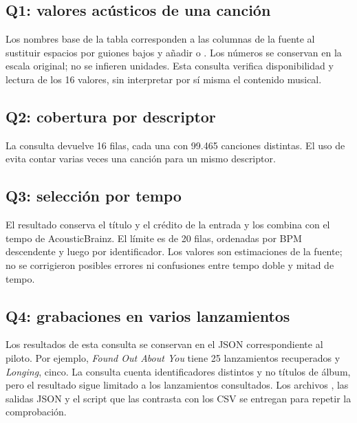 \documentclass[11pt,a4paper]{article}
\begin{document}
\subsection{Q1: valores acústicos de una canción}



Los nombres base de la tabla corresponden a las columnas de la fuente al sustituir espacios por guiones bajos y añadir  o . Los números se conservan en la escala original; no se infieren unidades. Esta consulta verifica disponibilidad y lectura de los 16 valores, sin interpretar por sí misma el contenido musical.

\newpage
\subsection{Q2: cobertura por descriptor}

La consulta devuelve 16 filas, cada una con 99.465 canciones distintas. El uso de  evita contar varias veces una canción para un mismo descriptor.

\subsection{Q3: selección por tempo}

El resultado conserva el título y el crédito de la entrada y los combina con el tempo de AcousticBrainz. El límite es de 20 filas, ordenadas por BPM descendente y luego por identificador. Los valores son estimaciones de la fuente; no se corrigieron posibles errores ni confusiones entre tempo doble y mitad de tempo.

\subsection{Q4: grabaciones en varios lanzamientos}

Los resultados de esta consulta se conservan en el JSON correspondiente al piloto. Por ejemplo, \emph{Found Out About You} tiene 25 lanzamientos recuperados y \emph{Longing}, cinco. La consulta cuenta identificadores distintos y no títulos de álbum, pero el resultado sigue limitado a los lanzamientos consultados. Los archivos , las salidas JSON y el script que las contrasta con los CSV se entregan para repetir la comprobación.
\end{document}
